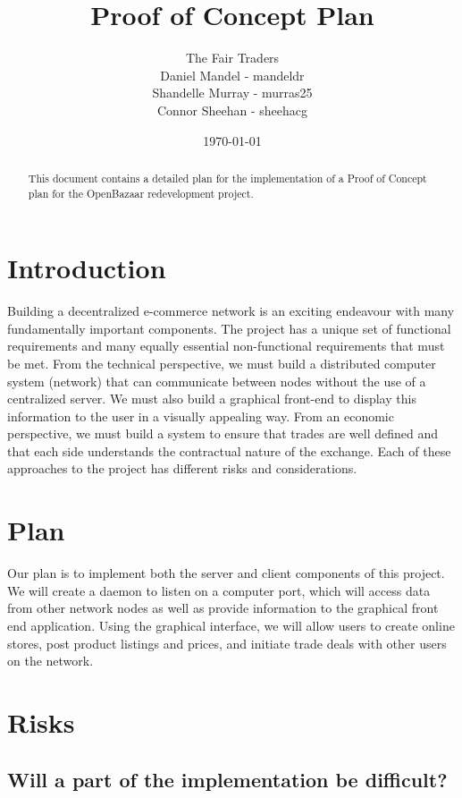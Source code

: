 \documentclass{article}
\begin{document}
\title{Proof of Concept Plan}
\author{The Fair Traders \\ Daniel Mandel - mandeldr \\ Shandelle Murray - murras25 \\ Connor Sheehan - sheehacg}
\date{\today}
\maketitle

\begin{abstract}
This document contains a detailed plan for the implementation of a Proof of Concept plan for the OpenBazaar redevelopment project.
\end{abstract}

\section{Introduction}
Building a decentralized e-commerce network is an exciting endeavour with many fundamentally important components. The project has a unique set of functional requirements and many equally essential non-functional requirements that must be met. From the technical perspective, we must build a distributed computer system (network) that can communicate between nodes without the use of a centralized server. We must also build a graphical front-end to display this information to the user in a visually appealing way. From an economic perspective, we must build a system to ensure that trades are well defined and that each side understands the contractual nature of the exchange. Each of these approaches to the project has different risks and considerations. 

\section{Plan}
Our plan is to implement both the server and client components of this project. We will create a daemon to listen on a computer port, which will access data from other network nodes as well as provide information to the graphical front end application. Using the graphical interface, we will allow users to create online stores, post product listings and prices, and initiate trade deals with other users on the network. 


\section{Risks}
\subsection{Will a part of the implementation be difficult?}
\end{document}
